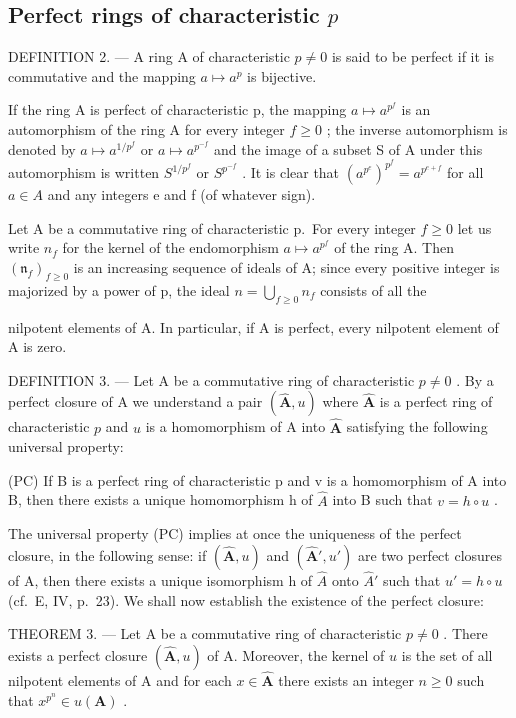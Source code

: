 \subsection{\texorpdfstring{Perfect rings of characteristic \(p\)}{Perfect rings of characteristic p}}

DEFINITION 2. --- A ring A of characteristic \(p \neq 0\) is said to be perfect if it is commutative and the mapping \(a \mapsto a^p\) is bijective.

If the ring A is perfect of characteristic p, the mapping \(a \mapsto a^{p^{f}}\) is an automorphism of the ring A for every integer \(f \geqslant 0\) ; the inverse automorphism is denoted by \(a \mapsto a^{1/p^{f}}\) or \(a \mapsto a^{p^{-f}}\) and the image of a subset S of A under this automorphism is written \(S^{1/p^{f}}\) or \(S^{p^{-f}}\) . It is clear that \((a^{p^{e}})^{p^{f}} = a^{p^{e+f}}\) for all \(a \in A\) and any integers e and f (of whatever sign).

Let A be a commutative ring of characteristic p.~For every integer \(f \geqslant 0\) let us write \(n_{f}\) for the kernel of the endomorphism \(a \mapsto a^{p^{f}}\) of the ring A. Then \((\mathfrak{n}_{f})_{f \geqslant 0}\) is an increasing sequence of ideals of A; since every positive integer is majorized by a power of p, the ideal \(n = \bigcup_{f \geqslant 0} n_{f}\) consists of all the

nilpotent elements of A. In particular, if A is perfect, every nilpotent element of A is zero.

DEFINITION 3. --- Let A be a commutative ring of characteristic \(p \neq 0\) . By a perfect closure of A we understand a pair \((\hat{\mathbf{A}}, u)\) where \(\hat{\mathbf{A}}\) is a perfect ring of characteristic \(p\) and \(u\) is a homomorphism of A into \(\hat{\mathbf{A}}\) satisfying the following universal property:

(PC) If B is a perfect ring of characteristic p and v is a homomorphism of A into B, then there exists a unique homomorphism h of \(\hat{A}\) into B such that \(v = h \circ u\) .

The universal property (PC) implies at once the uniqueness of the perfect closure, in the following sense: if \((\hat{\mathbf{A}}, u)\) and \((\hat{\mathbf{A}}', u')\) are two perfect closures of A, then there exists a unique isomorphism h of \(\hat{A}\) onto \(\hat{A}'\) such that \(u' = h \circ u\) (cf.~E, IV, p.~23). We shall now establish the existence of the perfect closure:

THEOREM 3. --- Let A be a commutative ring of characteristic \(p \neq 0\) . There exists a perfect closure \((\hat{\mathbf{A}}, u)\) of A. Moreover, the kernel of \(u\) is the set of all nilpotent elements of A and for each \(x \in \hat{\mathbf{A}}\) there exists an integer \(n \geqslant 0\) such that \(x^{p^n} \in u(\mathbf{A})\) .


